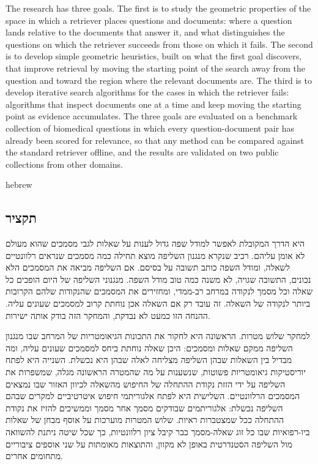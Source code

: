 \documentclass[12pt,a4paper]{article}
\begin{document}
The research has three goals. The first is to study the geometric properties of the space in which a retriever places questions and documents: where a question lands relative to the documents that answer it, and what distinguishes the questions on which the retriever succeeds from those on which it fails. The second is to develop simple geometric heuristics, built on what the first goal discovers, that improve retrieval by moving the starting point of the search away from the question and toward the region where the relevant documents are. The third is to develop iterative search algorithms for the cases in which the retriever fails: algorithms that inspect documents one at a time and keep moving the starting point as evidence accumulates. The three goals are evaluated on a benchmark collection of biomedical questions in which every question-document pair has already been scored for relevance, so that any method can be compared against the standard retriever offline, and the results are validated on two public collections from other domains.

\begin{otherlanguage*}{hebrew}\sloppy\setlength{\emergencystretch}{3em}
\subsection*{\texthebrew{תקציר}}
\textenglish{} היא הדרך המקובלת לאפשר למודל שפה גדול לענות על שאלות לגבי מסמכים שהוא מעולם לא אומן עליהם. רכיב שנקרא מנגנון השליפה מוצא תחילה כמה מסמכים שנראים רלוונטיים לשאלה, ומודל השפה כותב תשובה על בסיסם. אם השליפה מביאה את המסמכים הלא נכונים, התשובה שגויה, לא משנה כמה טוב מודל השפה. מנגנוני השליפה של היום הופכים כל שאלה וכל מסמך לנקודה במרחב רב-ממדי, ומחזירים את המסמכים שהנקודות שלהם הקרובות ביותר לנקודה של השאלה. זה עובד רק אם השאלה אכן נוחתת קרוב למסמכים שעונים עליה. ההנחה הזו כמעט לא נבדקת, והמחקר הזה בודק אותה ישירות.

למחקר שלוש מטרות. הראשונה היא לחקור את התכונות הגיאומטריות של המרחב שבו מנגנון השליפה ממקם שאלות ומסמכים: היכן שאלה נוחתת ביחס למסמכים שעונים עליה, ומה מבדיל בין השאלות שבהן השליפה מצליחה לאלה שבהן היא נכשלת. השנייה היא לפתח יוריסטיקות גיאומטריות פשוטות, שנשענות על מה שהמטרה הראשונה מגלה, שמשפרות את השליפה על ידי הזזת נקודת ההתחלה של החיפוש מהשאלה לכיוון האזור שבו נמצאים המסמכים הרלוונטיים. השלישית היא לפתח אלגוריתמי חיפוש איטרטיביים למקרים שבהם השליפה נכשלת: אלגוריתמים שבודקים מסמך אחר מסמך וממשיכים להזיז את נקודת ההתחלה ככל שמצטברות ראיות. שלוש המטרות מוערכות על אוסף מבחן של שאלות ביו-רפואיות שבו כל זוג שאלה-מסמך כבר קיבל ציון רלוונטיות, כך שכל שיטה ניתנת להשוואה מול השליפה הסטנדרטית באופן לא מקוון, והתוצאות מאומתות על שני אוספים ציבוריים מתחומים אחרים.
\end{otherlanguage*}
\end{document}
